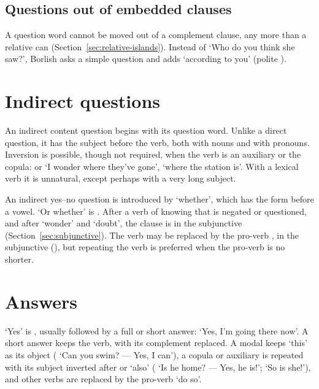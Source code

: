 \subsection{Questions out of embedded clauses}
A question word cannot be moved out of a complement clause, any more than a relative can (Section~\ref{sec:relative-islands}). Instead of `Who do you think she saw?', Borlish asks a simple question and adds  `according to you' (polite ).

\section{Indirect questions}\label{sec:indirect-questions}
An indirect content question begins with its question word. Unlike a direct question, it has the subject before the verb, both with nouns and with pronouns.
Inversion is possible, though not required, when the verb is an auxiliary or the copula:  or  `I wonder where they've gone',  `where the station is'. With a lexical verb it is unnatural, except perhaps with a very long subject.

An indirect yes--no question is introduced by  `whether', which has the form  before a vowel. `Or whether' is . After a verb of knowing that is negated or questioned, and after  `wonder' and  `doubt', the clause is in the subjunctive (Section~\ref{sec:subjunctive}).
The verb may be replaced by the pro-verb , in the subjunctive (), but repeating the verb is preferred when the pro-verb is no shorter.

\section{Answers}\label{sec:answers}
`Yes' is , usually followed by a full or short answer:  `Yes, I'm going there now'. A short answer keeps the verb, with its complement replaced. A modal keeps  `this' as its object ( `Can you swim? --- Yes, I can'), a copula or auxiliary is repeated with its subject inverted after  or  `also' ( `Is he home? --- Yes, he is!';  `So is she!'), and other verbs are replaced by the pro-verb  `do so'.

